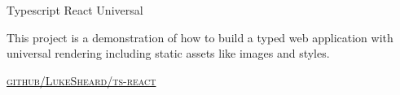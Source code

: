 {\raggedright
  {\large {
    Typescript React Universal
  } \\}


  This project is a demonstration of how to build a typed web application with universal rendering including static assets like images and styles.

  \textsc{\small\href{http://github.com/LukeSheard/typescript-universal-boilerplate-react}{github/LukeSheard/ts-react}}
} \\
